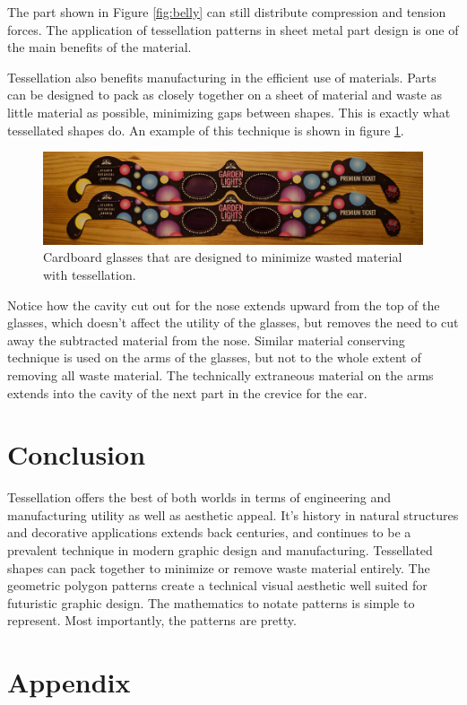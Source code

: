 \documentclass[12pt,letterpaper]{article}
\begin{document}
The part shown in Figure \ref{fig:belly} can still distribute compression and tension forces. The application of tessellation patterns in sheet metal part design is one of the main benefits of the material.

Tessellation also benefits manufacturing in the efficient use of materials. Parts can be designed to pack as closely together on a sheet of material and waste as little material as possible, minimizing gaps between shapes. This is exactly what tessellated shapes do. An example of this technique is shown in figure \ref{fig:glasses}.

\begin{figure}[H]
	\begin{center}
		\caption{Cardboard glasses that are designed to minimize wasted material with tessellation.}
		\label{fig:glasses}
		\includegraphics[width=.8\linewidth]{glasses}
	\end{center}
\end{figure}

Notice how the cavity cut out for the nose extends upward from the top of the glasses, which doesn't affect the utility of the glasses, but removes the need to cut away the subtracted material from the nose. Similar material conserving technique is used on the arms of the glasses, but not to the whole extent of removing all waste material. The technically extraneous material on the arms extends into the cavity of the next part in the crevice for the ear. 

\section{Conclusion}

Tessellation offers the best of both worlds in terms of engineering and manufacturing utility as well as aesthetic appeal. It's history in natural structures and decorative applications extends back centuries, and continues to be a prevalent technique in modern graphic design and manufacturing. Tessellated shapes can pack together to minimize or remove waste material entirely. The geometric polygon patterns create a technical visual aesthetic well suited for futuristic graphic design. The mathematics to notate patterns is simple to represent. Most importantly, the patterns are pretty.

\newpage



\newpage
\section{Appendix}
\listoffigures
\end{document}
